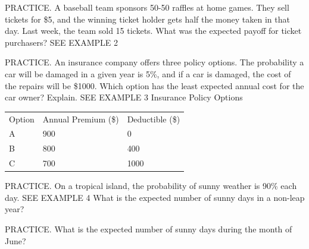 \documentclass{article}
\newenvironment{practice}[2]{}{}        %
\newcommand{\answer}[1]{}               %
\newcommand{\te}[1]{}                   %
\begin{document}
\begin{practice}{17}{2}
PRACTICE. A baseball team sponsors 50-50 raffles at home games. They sell tickets for \$5, and the winning ticket holder gets half the money taken in that day. Last week, the team sold 15 tickets. What was the expected payoff for ticket purchasers? SEE EXAMPLE 2
\answer{(-\$2.50)}
\end{practice}
\begin{practice}{18}{2}
PRACTICE. An insurance company offers three policy options. The probability a car will be damaged in a given year is 5\%, and if a car is damaged, the cost of the repairs will be \$1000. Which option has the least expected annual cost for the car owner? Explain. SEE EXAMPLE 3
Insurance Policy Options
\begin{tabular}{lll}
Option & Annual Premium (\$) & Deductible (\$) \\
A & 900 & 0 \\
B & 800 & 400 \\
C & 700 & 1000 \\
\end{tabular}
\answer{Option C; the cost for the car owner for Option A is \$900: for Option B, \$820; for Option C, \$750.}
\te{Answer printed on next teacher page, PDF page 69.}
\end{practice}
\begin{practice}{19}{1}
PRACTICE. On a tropical island, the probability of sunny weather is 90\% each day. SEE EXAMPLE 4
What is the expected number of sunny days in a non-leap year?
\answer{328.5 days}
\end{practice}
\begin{practice}{20}{1}
PRACTICE. What is the expected number of sunny days during the month of June?
\te{Uses tropical island data in item 19. SEE EXAMPLE 4.}
\answer{27 days}
\end{practice}
\end{document}
